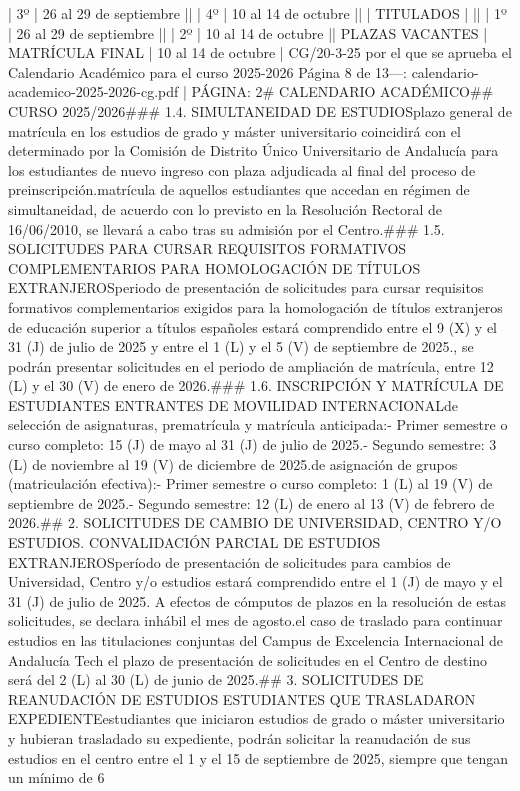 \documentclass{article}
\begin{document}
\begin{itemize}
{    | 3º                          | 26 al 29 de septiembre       |\n|                                | 4º                          | 10 al 14 de octubre         |\n|                                | TITULADOS                   |                             |\n|                                | 1º                          | 26 al 29 de septiembre       |\n|                                | 2º                          | 10 al 14 de octubre         |\n| PLAZAS VACANTES               | MATRÍCULA FINAL             | 10 al 14 de octubre         |\n{} CG/20-3-25 por el que se aprueba el Calendario Académico para el curso 2025-2026  Página 8 de 13\n\n---\n\nFUENTE: calendario-academico-2025-2026-cg.pdf | PÁGINA: 2\n# CALENDARIO ACADÉMICO\n## CURSO 2025/2026\n\n### 1.4. SIMULTANEIDAD DE ESTUDIOS\n\nEl plazo general de matrícula en los estudios de grado y máster universitario coincidirá con el determinado por la Comisión de Distrito Único Universitario de Andalucía para los estudiantes de nuevo ingreso con plaza adjudicada al final del proceso de preinscripción.\n\nLa matrícula de aquellos estudiantes que accedan en régimen de simultaneidad, de acuerdo con lo previsto en la Resolución Rectoral de 16/06/2010, se llevará a cabo tras su admisión por el Centro.\n\n### 1.5. SOLICITUDES PARA CURSAR REQUISITOS FORMATIVOS COMPLEMENTARIOS PARA HOMOLOGACIÓN DE TÍTULOS EXTRANJEROS\n\nEl periodo de presentación de solicitudes para cursar requisitos formativos complementarios exigidos para la homologación de títulos extranjeros de educación superior a títulos españoles estará comprendido entre el 9 (X) y el 31 (J) de julio de 2025 y entre el 1 (L) y el 5 (V) de septiembre de 2025.\n\nIgualmente, se podrán presentar solicitudes en el periodo de ampliación de matrícula, entre 12 (L) y el 30 (V) de enero de 2026.\n\n### 1.6. INSCRIPCIÓN Y MATRÍCULA DE ESTUDIANTES ENTRANTES DE MOVILIDAD INTERNACIONAL\n\nFechas de selección de asignaturas, prematrícula y matrícula anticipada:\n- Primer semestre o curso completo: 15 (J) de mayo al 31 (J) de julio de 2025.\n- Segundo semestre: 3 (L) de noviembre al 19 (V) de diciembre de 2025.\n\nFecha de asignación de grupos (matriculación efectiva):\n- Primer semestre o curso completo: 1 (L) al 19 (V) de septiembre de 2025.\n- Segundo semestre: 12 (L) de enero al 13 (V) de febrero de 2026.\n\n## 2. SOLICITUDES DE CAMBIO DE UNIVERSIDAD, CENTRO Y/O ESTUDIOS. CONVALIDACIÓN PARCIAL DE ESTUDIOS EXTRANJEROS\n\nEl período de presentación de solicitudes para cambios de Universidad, Centro y/o estudios estará comprendido entre el 1 (J) de mayo y el 31 (J) de julio de 2025. A efectos de cómputos de plazos en la resolución de estas solicitudes, se declara inhábil el mes de agosto.\n\nEn el caso de traslado para continuar estudios en las titulaciones conjuntas del Campus de Excelencia Internacional de Andalucía Tech el plazo de presentación de solicitudes en el Centro de destino será del 2 (L) al 30 (L) de junio de 2025.\n\n## 3. SOLICITUDES DE REANUDACIÓN DE ESTUDIOS ESTUDIANTES QUE TRASLADARON EXPEDIENTE\n\nLos estudiantes que iniciaron estudios de grado o máster universitario y hubieran trasladado su expediente, podrán solicitar la reanudación de sus estudios en el centro entre el 1 y el 15 de septiembre de 2025, siempre que tengan un mínimo de 6 }
\end{itemize}
\end{document}
